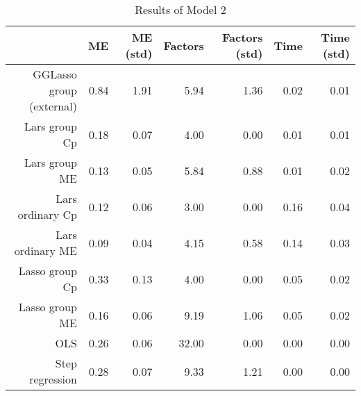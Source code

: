 \begin{table}[ht]
\centering
\begin{tabular}{rrrrrrr}
  \hline
 & ME & ME (std) & Factors & Factors (std) & Time & Time (std) \\ 
  \hline
GGLasso group (external) & 0.84 & 1.91 & 5.94 & 1.36 & 0.02 & 0.01 \\ 
  Lars group Cp & 0.18 & 0.07 & 4.00 & 0.00 & 0.01 & 0.01 \\ 
  Lars group ME & 0.13 & 0.05 & 5.84 & 0.88 & 0.01 & 0.02 \\ 
  Lars ordinary Cp & 0.12 & 0.06 & 3.00 & 0.00 & 0.16 & 0.04 \\ 
  Lars ordinary ME & 0.09 & 0.04 & 4.15 & 0.58 & 0.14 & 0.03 \\ 
  Lasso group Cp & 0.33 & 0.13 & 4.00 & 0.00 & 0.05 & 0.02 \\ 
  Lasso group ME & 0.16 & 0.06 & 9.19 & 1.06 & 0.05 & 0.02 \\ 
  OLS & 0.26 & 0.06 & 32.00 & 0.00 & 0.00 & 0.00 \\ 
  Step regression & 0.28 & 0.07 & 9.33 & 1.21 & 0.00 & 0.00 \\ 
   \hline
\end{tabular}
\caption{Results of Model 2} 
\end{table}
